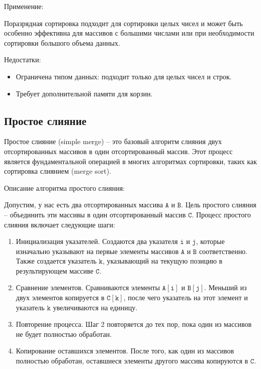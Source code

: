 \documentclass[]{article}
\theoremstyle{remark}
\theoremstyle{definition}
\newcommand{\term}[1]{$\mathtt{#1}$}
\begin{document}
\par Применение:
\par Поразрядная сортировка подходит для сортировки целых чисел и может быть особенно эффективна для массивов с большими числами или при необходимости сортировки большого объема данных.

\par Недостатки:
\begin{itemize}
    \item Ограничена типом данных: подходит только для целых чисел и строк.
    \item Требует дополнительной памяти для корзин.
\end{itemize}

\subsection{Простое слияние}

\par Простое слияние (simple merge) -- это базовый алгоритм слияния двух отсортированных массивов в один отсортированный массив. Этот процесс является фундаментальной операцией в многих алгоритмах сортировки, таких как сортировка слиянием (merge sort).

\par Описание алгоритма простого слияния:

\par Допустим, у нас есть два отсортированных массива \term{A} и \term{B}. Цель простого слияния -- объединить эти массивы в один отсортированный массив \term{C}. Процесс простого слияния включает следующие шаги:

\begin{enumerate}
    \item Инициализация указателей. Создаются два указателя \term{i} и \term{j}, которые изначально указывают на первые элементы массивов \term{A} и \term{B} соответственно. Также создается указатель \term{k}, указывающий на текущую позицию в результирующем массиве \term{C}.
    \item Сравнение элементов. Сравниваются элементы \term{A[i]} и \term{B[j]}. Меньший из двух элементов копируется в \term{C[k]}, после чего указатель на этот элемент и указатель \term{k} увеличиваются на единицу.
    \item Повторение процесса. Шаг 2 повторяется до тех пор, пока один из массивов не будет полностью обработан.
    \item Копирование оставшихся элементов. После того, как один из массивов полностью обработан, оставшиеся элементы другого массива копируются в \term{C}.
\end{enumerate}
\end{document}
